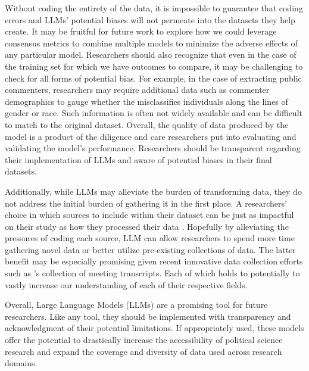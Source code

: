     Without coding the entirety of the data, it is impossible to guarantee that coding errors and LLMs' potential biases will not permeate into the datasets they help create. It may be fruitful for future work to explore how we could leverage consensus metrics to combine multiple models to minimize the adverse effects of any particular model. Researchers should also recognize that even in the case of the training set for which we have outcomes to compare, it may be challenging to check for all forms of potential bias. For example, in the case of extracting public commenters, researchers may require additional data such as commenter demographics to gauge whether the misclassifies individuals along the lines of gender or race. Such information is often not widely available and can be difficult to match to the original dataset. Overall, the quality of data produced by the model is a product of the diligence and care researchers put into evaluating and validating the model's performance. Researchers should be transparent regarding their implementation of LLMs and aware of potential biases in their final datasets.

    Additionally, while LLMs may alleviate the burden of transforming data, they do not address the initial burden of gathering it in the first place. A researchers’ choice in which sources to include within their dataset can be just as impactful on their study as how they processed their data \citep{gaikwadTransparencyTextBasedSources2023}.  Hopefully by alleviating the pressures of coding each source, LLM can allow researchers to spend more time gathering novel data or better utilize pre-existing collections of data. The latter benefit may be especially promising given recent innovative data collection efforts such as \citep{barariLocalViewDatabasePublic2023}’s collection of meeting transcripts. Each of which holds to potentially to vastly increase our understanding of each of their respective fields. 

    Overall, Large Language Models (LLMs) are a promising tool for future researchers. Like any tool, they should be implemented with transparency and acknowledgment of their potential limitations. If appropriately used, these models offer the potential to drastically increase the accessibility of political science research and expand the coverage and diversity of data used across research domains.

